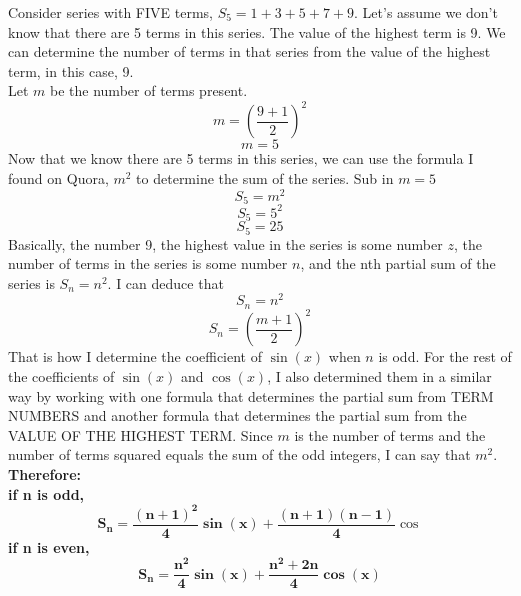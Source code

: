 \documentclass[12pt]{book}
\begin{document}
\begin{enumerate}
Consider series with FIVE terms, $S_5 = 1 + 3 + 5 + 7 + 9$. Let's assume we don't know that there are 5 terms in this series. The value of the highest term is 9. We can determine the number of terms in that series from the value of the highest term, in this case, 9.\\
Let $m$ be the number of terms present.
$$m = \left(\dfrac{9+1}{2}\right)^2$$
$$m = 5$$
Now that we know there are 5 terms in this series, we can use the formula I found on Quora, $m^2$ to determine the sum of the series.
Sub in $m = 5$
$$S_5 = m^2$$
$$S_5 = 5^2$$
$$S_5 = 25$$
Basically, the number 9, the highest value in the series is some number $z$, the number of terms in the series is some number $n$, and the nth partial sum of the series is $S_n = n^2$. I can deduce that
$$S_n = n^2$$
$$S_n = \left(\dfrac{m+1}{2}\right)^2$$
That is how I determine the coefficient of $\sin(x)$ when $n$ is odd. For the rest of the coefficients of $\sin(x)$ and $\cos(x)$, I also determined them in a similar way by working with one formula that determines the partial sum from TERM NUMBERS and another formula that determines the partial sum from the VALUE OF THE HIGHEST TERM.
Since $m$ is the number of terms and the number of terms squared equals the sum of the odd integers, I can say that $m^2$.\\

\textbf{Therefore:}\\
\textbf{if n is odd,} $$\mathbf{S_n = \dfrac{(n+1)^2}{4}\sin(x) + \dfrac{(n+1)(n-1)}{4}}\cos$$
\textbf{if n is even,} $$\mathbf{S_n = \dfrac{n^2}{4}\sin(x) + \dfrac{n^2 +2n}{4}\cos(x)}$$







\newpage


\end{enumerate}
\end{document}
